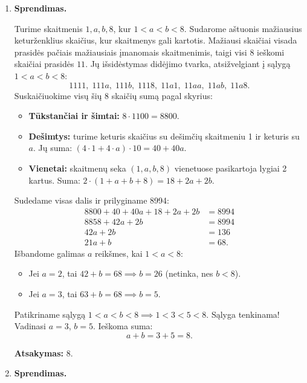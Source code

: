 \documentclass[11pt,a4paper]{article}
\begin{document}
\begin{enumerate}
    \textbf{Atsakymas:} $729$.

    \vspace{0.3cm}
    \item \textbf{Sprendimas.}
    
    Turime skaitmenis $1, a, b, 8$, kur $1 < a < b < 8$. Sudarome aštuonis mažiausius keturženklius skaičius, kur skaitmenys gali kartotis. Mažiausi skaičiai visada prasidės pačiais mažiausiais įmanomais skaitmenimis, taigi visi 8 ieškomi skaičiai prasidės $11$.
    Jų išsidėstymas didėjimo tvarka, atsižvelgiant į sąlygą $1 < a < b < 8$:
    \[ 1111,\; 111a,\; 111b,\; 1118,\; 11a1,\; 11aa,\; 11ab,\; 11a8. \]
    Suskaičiuokime visų šių 8 skaičių sumą pagal skyrius:
    \begin{itemize}
        \item \textbf{Tūkstančiai ir šimtai:} $8 \cdot 1100 = 8800$.
        \item \textbf{Dešimtys:} turime keturis skaičius su dešimčių skaitmeniu 1 ir keturis su $a$. Jų suma: $(4 \cdot 1 + 4 \cdot a) \cdot 10 = 40 + 40a$.
        \item \textbf{Vienetai:} skaitmenų seka $(1, a, b, 8)$ vienetuose pasikartoja lygiai 2 kartus. Suma: $2 \cdot (1 + a + b + 8) = 18 + 2a + 2b$.
    \end{itemize}
    Sudedame visas dalis ir prilyginame 8994:
    \begin{align*}
        8800 + 40 + 40a + 18 + 2a + 2b &= 8994 \\
        8858 + 42a + 2b &= 8994 \\
        42a + 2b &= 136 \\
        21a + b &= 68.
    \end{align*}
    Išbandome galimas $a$ reikšmes, kai $1 < a < 8$:
    \begin{itemize}
        \item Jei $a = 2$, tai $42 + b = 68 \implies b = 26$ (netinka, nes $b < 8$).
        \item Jei $a = 3$, tai $63 + b = 68 \implies b = 5$.
    \end{itemize}
    Patikriname sąlygą $1 < a < b < 8 \implies 1 < 3 < 5 < 8$. Sąlyga tenkinama!
    Vadinasi $a = 3$, $b = 5$. Ieškoma suma:
    \[ a + b = 3 + 5 = 8. \]
    
    \textbf{Atsakymas:} $8$.

    \vspace{0.3cm}
    \item \textbf{Sprendimas.}
    

\end{enumerate}
\end{document}
